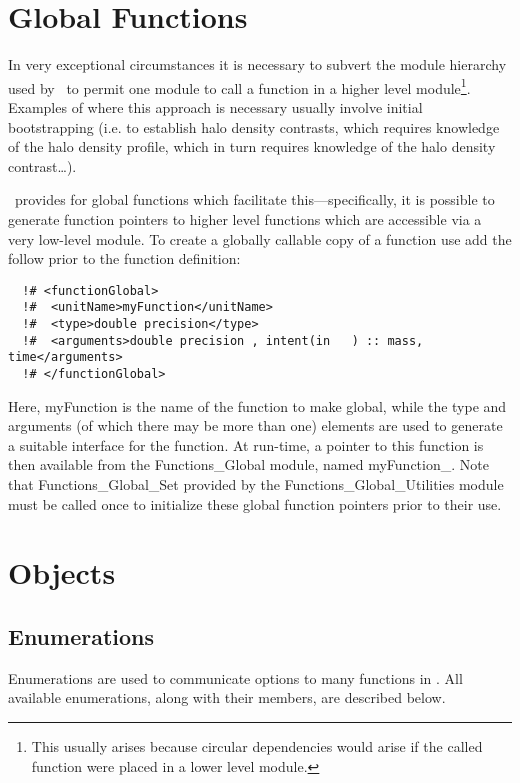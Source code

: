 \section{Global Functions}

In very exceptional circumstances it is necessary to subvert the module hierarchy used by \glc\ to permit one module to call a function in a higher level module\footnote{This usually arises because circular dependencies would arise if the called function were placed in a lower level module.}. Examples of where this approach is necessary usually involve initial bootstrapping (i.e. to establish halo density contrasts, which requires knowledge of the halo density profile, which in turn requires knowledge of the halo density contrast\ldots).

\glc\ provides for global functions which facilitate this---specifically, it is possible to generate function pointers to higher level functions which are accessible via a very low-level module. To create a globally callable copy of a function use add the follow prior to the function definition:
\begin{verbatim}
  !# <functionGlobal>
  !#  <unitName>myFunction</unitName>
  !#  <type>double precision</type>
  !#  <arguments>double precision , intent(in   ) :: mass, time</arguments>
  !# </functionGlobal>
\end{verbatim}
Here, {\normalfont \ttfamily myFunction} is the name of the function to make global, while the {\normalfont \ttfamily type} and {\normalfont \ttfamily arguments} (of which there may be more than one) elements are used to generate a suitable interface for the function. At run-time, a pointer to this function is then available from the {\normalfont \ttfamily Functions\_Global} module, named {\normalfont \ttfamily myFunction\_}. Note that {\normalfont \ttfamily Functions\_Global\_Set} provided by the {\normalfont \ttfamily Functions\_Global\_Utilities} module must be called once to initialize these global function pointers prior to their use.

\section{Objects}

\subsection{Enumerations}

Enumerations are used to communicate options to many functions in \glc. All available enumerations, along with their members, are described below.

